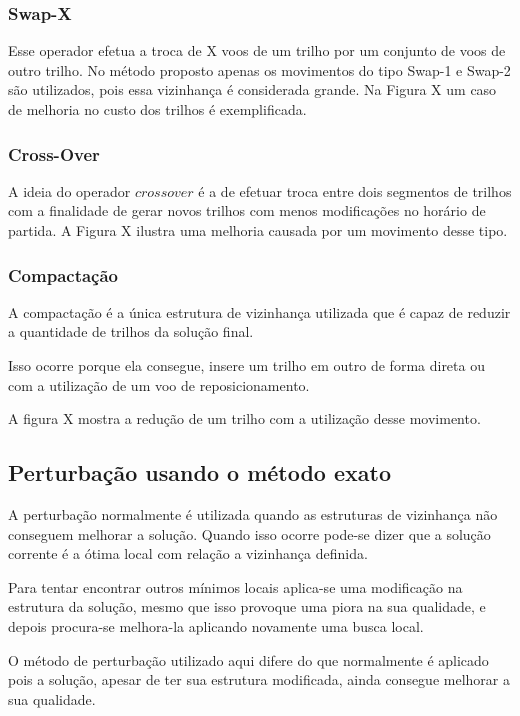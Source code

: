 \subsubsection{Swap-X}

Esse operador efetua a troca de X voos de um trilho por um conjunto de voos de outro trilho. No método proposto apenas os movimentos do tipo Swap-1 e Swap-2 são utilizados, pois essa vizinhança é considerada grande. Na Figura X um caso de melhoria no custo dos trilhos é exemplificada. 
 
 \subsubsection{Cross-Over}
 
 A ideia do operador $crossover$ é a de efetuar troca entre dois segmentos de trilhos com a finalidade de gerar novos trilhos com menos modificações no horário de partida. A Figura X ilustra uma melhoria causada por um movimento desse tipo.
 
 \subsubsection{Compactação}
 
 A compactação é a única estrutura de vizinhança utilizada que é capaz de reduzir a quantidade de trilhos da solução final.
 
 Isso ocorre porque ela consegue, insere um trilho em outro de forma direta ou com a utilização de um voo de reposicionamento.
 
 A figura X mostra a redução de um trilho com a utilização desse movimento.
 
 \subsection{Perturbação usando o método exato}
   
 A perturbação normalmente é utilizada quando as estruturas de vizinhança não
 conseguem melhorar a solução. Quando isso ocorre pode-se dizer que a solução corrente é a ótima local com relação a vizinhança definida.
 
 Para tentar encontrar outros mínimos locais aplica-se uma modificação na estrutura da solução, mesmo que isso provoque uma piora na sua qualidade, e depois procura-se melhora-la aplicando novamente uma busca local.
 
 O método de perturbação utilizado aqui difere do que normalmente é aplicado pois a solução, apesar de ter sua estrutura modificada, ainda consegue melhorar a sua qualidade.
 
